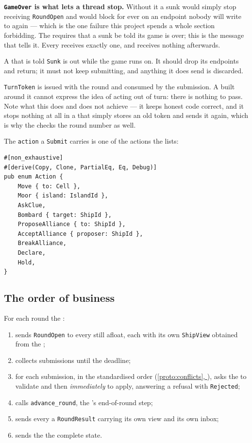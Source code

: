 \documentclass{article}
\newcommand{\fullref}[1]{\hyperref[#1]{\cref*{#1}, \nameref*{#1}}}
\begin{document}
\textbf{\texttt{GameOver} is what lets a \ship{} thread stop.} Without it a sunk \ship{} would
simply stop receiving \texttt{RoundOpen} and would block for ever on an endpoint nobody will
write to again --- which is the one failure this project spends a whole section forbidding. The
\MD{} requires that a sunk \ship{} be told its game is over; this is the message that tells it.
Every \ship{} receives exactly one, and receives nothing afterwards.

A \ship{} that is told \texttt{Sunk} is out while the game runs on. It should drop its endpoints
and return; it must not keep submitting, and anything it does send is discarded.

\texttt{TurnToken} is issued with the round and consumed by the submission. A \ship{} built around
it cannot express the idea of acting out of turn: there is nothing to pass. Note what this does and
does not achieve --- it keeps honest code correct, and it stops nothing at all in a \ship{} that
simply stores an old token and sends it again, which is why the \admiralty{} checks the round
number as well.

The \texttt{action} a \texttt{Submit} carries is one of the actions the \MD{} lists:

\begin{lstlisting}
#[non_exhaustive]
#[derive(Copy, Clone, PartialEq, Eq, Debug)]
pub enum Action {
    Move { to: Cell },
    Moor { island: IslandId },
    AskClue,
    Bombard { target: ShipId },
    ProposeAlliance { to: ShipId },
    AcceptAlliance { proposer: ShipId },
    BreakAlliance,
    Declare,
    Hold,
}
\end{lstlisting}

\subsection{The order of business}

For each round the \admiralty:

\begin{enumerate}
    \item sends \texttt{RoundOpen} to every \ship{} still afloat, each with its
      own \texttt{ShipView} obtained from the \chart;
    \item collects submissions until the deadline;
    \item for each submission, in the standardised order (\fullref{proto:conflicts}), asks the
      \chart{} to validate and then \emph{immediately} to apply, answering a refusal with
      \texttt{Rejected};
    \item calls \texttt{advance\_round}, the \chart's end-of-round step;
    \item sends every \ship{} a \texttt{RoundResult} carrying its own view and its own inbox;
    \item sends the \cartographer{} the complete state.
\end{enumerate}
\end{document}
